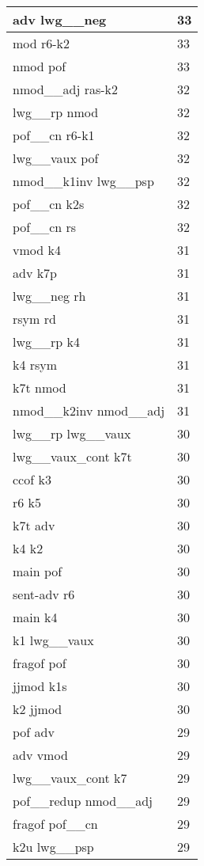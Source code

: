 \documentclass[a4 paper]{article}
\begin{document}
\begin{longtable}{p{}p{}}
adv lwg\_\_neg  & 33 \\ \midrule
mod r6-k2  & 33 \\ \midrule
nmod pof  & 33 \\ \midrule
nmod\_\_adj ras-k2  & 32 \\ \midrule
lwg\_\_rp nmod  & 32 \\ \midrule
pof\_\_cn r6-k1  & 32 \\ \midrule
lwg\_\_vaux pof  & 32 \\ \midrule
nmod\_\_k1inv lwg\_\_psp  & 32 \\ \midrule
pof\_\_cn k2s  & 32 \\ \midrule
pof\_\_cn rs  & 32 \\ \midrule
vmod k4  & 31 \\ \midrule
adv k7p  & 31 \\ \midrule
lwg\_\_neg rh  & 31 \\ \midrule
rsym rd  & 31 \\ \midrule
lwg\_\_rp k4  & 31 \\ \midrule
k4 rsym  & 31 \\ \midrule
k7t nmod  & 31 \\ \midrule
nmod\_\_k2inv nmod\_\_adj  & 31 \\ \midrule
lwg\_\_rp lwg\_\_vaux  & 30 \\ \midrule
lwg\_\_vaux\_cont k7t  & 30 \\ \midrule
ccof k3  & 30 \\ \midrule
r6 k5  & 30 \\ \midrule
k7t adv  & 30 \\ \midrule
k4 k2  & 30 \\ \midrule
main pof  & 30 \\ \midrule
sent-adv r6  & 30 \\ \midrule
main k4  & 30 \\ \midrule
k1 lwg\_\_vaux  & 30 \\ \midrule
fragof pof  & 30 \\ \midrule
jjmod k1s  & 30 \\ \midrule
k2 jjmod  & 30 \\ \midrule
pof adv  & 29 \\ \midrule
adv vmod  & 29 \\ \midrule
lwg\_\_vaux\_cont k7  & 29 \\ \midrule
pof\_\_redup nmod\_\_adj  & 29 \\ \midrule
fragof pof\_\_cn  & 29 \\ \midrule
k2u lwg\_\_psp  & 29 \\ \midrule

\end{longtable}
\end{document}
